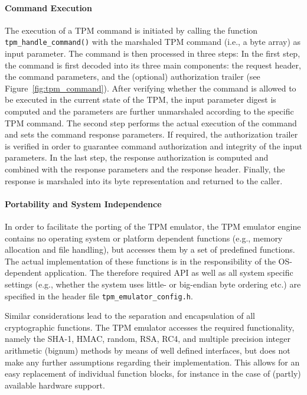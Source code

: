 \documentclass[11pt,letterpaper]{article}
\newcommand{\file}[1]{\small\texttt{#1}\normalsize}
\newcommand{\func}[1]{\small\texttt{#1}\normalsize}
\begin{document}
\paragraph{Command Execution}
The execution of a TPM command is initiated by calling the function \func{tpm\_\-handle\_\-command()}
with the marshaled TPM command (i.e., a byte array) as input parameter. The command is then
processed in three steps: In the first step, the command
is first decoded into its three main components: the request header, the command parameters, and
the (optional) authorization trailer (see Figure~\ref{fig:tpm_command}). After verifying whether the
command is allowed to be executed in the current state of the TPM, the input parameter digest is
computed and the parameters are further unmarshaled according to the specific TPM command. The
second step performs the actual execution of the command and sets the command response parameters.
If required, the authorization trailer is verified in order to guarantee command authorization and
integrity of the input parameters. In the last step, the response authorization is computed and
combined with the response parameters and the response header. Finally, the response is
marshaled into its byte representation and returned to the caller.

\paragraph{Portability and System Independence}
In order to facilitate the porting of the TPM emulator, the TPM emulator engine contains no
operating system or platform dependent functions (e.g., memory allocation and file handling),
but accesses them by a set of predefined functions. The actual implementation of these functions
is in the responsibility of the OS-dependent application. The therefore required API as well as
all system specific settings (e.g., whether the system uses little- or big-endian byte ordering
etc.) are specified in the header file \file{tpm\_emulator\_config.h}.

Similar considerations lead to the separation and encapsulation of all cryptographic functions.
The TPM emulator accesses the required functionality, namely the SHA-1, HMAC, random, RSA, RC4,
and multiple precision integer arithmetic (bignum) methods by means of well defined interfaces,
but does not make any further assumptions regarding their implementation. This allows for an easy
replacement of individual function blocks, for instance in the case of (partly) available hardware
support.
\end{document}
